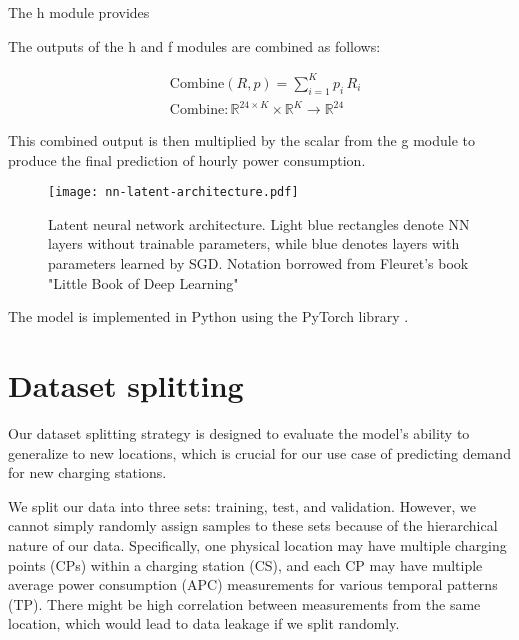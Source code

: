 \begin{itemize}
\begin{itemize}
{                  \vspace{3mm}

                  The h module provides
              }
          \end{itemize}
\end{itemize}

\vspace{5mm}

\newpage

The outputs of the h and f modules are combined as follows:

\[
    \begin{split}
         & \text{Combine}(R,p) = \sum_{i=1}^K p_i \, R_i                                            \\
         & \text{Combine}: \mathbb{R}^{24 \times K} \times \mathbb{R}^K \rightarrow \mathbb{R}^{24}
    \end{split}
\]

This combined output is then multiplied by the scalar from the g module to produce the final prediction of hourly power consumption.

\begin{figure}[hb]
    \texttt{[image: nn-latent-architecture.pdf]}
    \caption[Latent Neural Network Architecture]{Latent neural network architecture. Light blue rectangles denote NN layers without trainable parameters, while blue denotes layers with parameters learned by SGD. Notation borrowed from Fleuret's book "Little Book of Deep Learning"}
    \label{fig:nn-latent}
\end{figure}

The model is implemented in Python using the PyTorch library
.

\newpage


\section{Dataset splitting}
\label{sec:dataset-split}

Our dataset splitting strategy is designed to evaluate the model's ability to generalize to new locations, which is crucial for our use case of predicting demand for new charging stations.

We split our data into three sets: training, test, and validation. However, we cannot simply randomly assign samples to these sets because of the hierarchical nature of our data. Specifically, one physical location may have multiple charging points (CPs) within a charging station (CS), and each CP may have multiple average power consumption (APC) measurements for various temporal patterns (TP). There might be high correlation between measurements from the same location, which would lead to data leakage if we split randomly.

